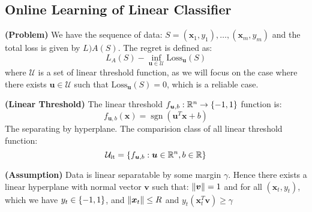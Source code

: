 \subsection{Online Learning of Linear Classifier}

\begin{definition}{\textbf{(Problem)}}
    We have the sequence of data: $S = (\boldsymbol x_1,y_1),\dots,(\boldsymbol x_m, y_m)$ and the total loss is given by $L)A(S)$. The regret is defined as:
    \begin{equation*}
        L_A(S ) - \inf_{\boldsymbol u \in \mathcal{U}}\text{Loss}_{\boldsymbol u}(S)
    \end{equation*}
    where $\mathcal{U}$ is a set of linear threshold function, as we will focus on the case where there exists $\boldsymbol u \in \mathcal{U}$ such that $\text{Loss}_{\boldsymbol u}(S) = 0$, which is a reliable case. 
\end{definition}

\begin{definition}{\textbf{(Linear Threshold)}}
    The linear threshold $f_{\boldsymbol u, b} : \mathbb{R}^n \rightarrow \left\{ -1, 1 \right\}$  function is:
    \begin{equation*}
        f_{\boldsymbol u, b}(\boldsymbol x) = \operatorname{sgn}(\boldsymbol u^T\boldsymbol x + b)
    \end{equation*}
    The separating by hyperplane. The comparision class of all linear threshold function:
    \begin{equation*}
        \mathcal{U}_\text{it} = \left\{ f_{\boldsymbol u, b} : \boldsymbol u \in \mathbb{R}^n, b \in \mathbb{R} \right\}
    \end{equation*}
\end{definition}

\begin{remark}{\textbf{(Assumption)}}
    Data is linear separatable by some margin $\gamma$. Hence there exists a linear hyperplane with normal vector $\boldsymbol v$ such that: $\left\lVert\boldsymbol v\right\rVert = 1$ and for all $(\boldsymbol x_t, y_t)$, which we have $y_t \in \left\{ -1, 1 \right\}$, and $\left\lVert\boldsymbol x_t\right\rVert \le R$ and $y_t(\boldsymbol x_t^T\boldsymbol v)\ge\gamma$
\end{remark}

